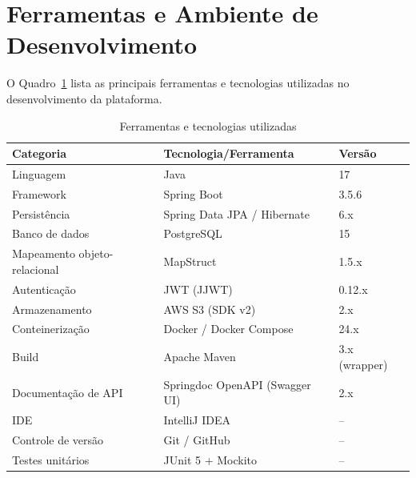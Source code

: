 \section{Ferramentas e Ambiente de Desenvolvimento}
\label{sec:ferramentas}

O Quadro~\ref{qdr:ferramentas} lista as principais ferramentas e tecnologias
utilizadas no desenvolvimento da plataforma.

\begin{table}[H]
  \centering
  \caption{Ferramentas e tecnologias utilizadas}
  \label{qdr:ferramentas}
  \begin{tabular}{lll}
    \toprule
    \textbf{Categoria}        & \textbf{Tecnologia/Ferramenta}    & \textbf{Versão} \\
    \midrule
    Linguagem                 & Java                              & 17              \\
    Framework                 & Spring Boot                       & 3.5.6           \\
    Persistência              & Spring Data JPA / Hibernate       & 6.x             \\
    Banco de dados            & PostgreSQL                        & 15              \\
    Mapeamento objeto-relacional & MapStruct                      & 1.5.x           \\
    Autenticação              & JWT (JJWT)                        & 0.12.x          \\
    Armazenamento             & AWS S3 (SDK v2)                   & 2.x             \\
    Conteinerização           & Docker / Docker Compose           & 24.x            \\
    Build                     & Apache Maven                      & 3.x (wrapper)   \\
    Documentação de API       & Springdoc OpenAPI (Swagger UI)    & 2.x             \\
    IDE                       & IntelliJ IDEA                     & --              \\
    Controle de versão        & Git / GitHub                      & --              \\
    Testes unitários          & JUnit 5 + Mockito                 & --              \\
    \bottomrule
  \end{tabular}
\end{table}

